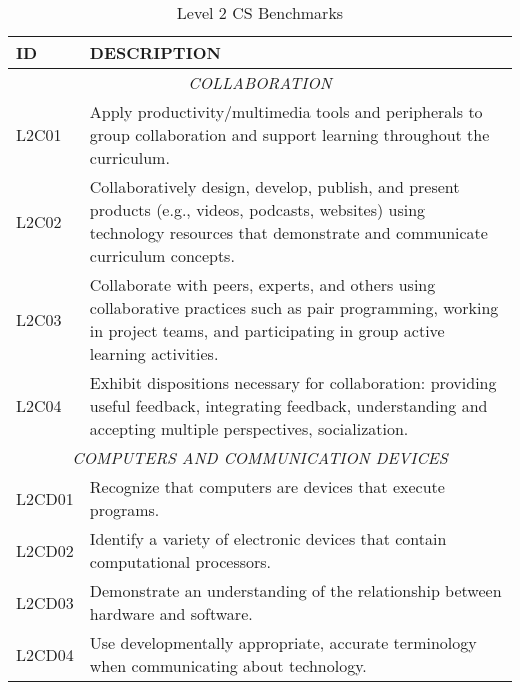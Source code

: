 \begin{longtable}{p{1.8cm}p{11cm}}
\caption{Level 2 CS Benchmarks} \\
\textbf{ID} & \textbf{DESCRIPTION} \\ \hline
\multicolumn{2}{c}{\textit{COLLABORATION}} \\
 L2C01   & Apply productivity/multimedia tools and peripherals to group collaboration and support learning throughout the curriculum.                                                                                                 \\
 L2C02   & Collaboratively design, develop, publish, and present products (e.g., videos, podcasts, websites) using technology resources that demonstrate and communicate curriculum concepts.                                         \\
 L2C03   & Collaborate with peers, experts, and others using collaborative practices such as pair programming, working in project teams, and participating in group active learning activities.                                       \\
 L2C04   & Exhibit dispositions necessary for collaboration: providing useful feedback, integrating feedback, understanding and accepting multiple perspectives, socialization.                                                       \\
 \multicolumn{2}{c}{\textit{COMPUTERS AND COMMUNICATION DEVICES}}                                                                                                                                                                                   \\
 L2CD01  & Recognize that computers are devices that execute programs.                                                                                                                                                                \\
 L2CD02  & Identify a variety of electronic devices that contain computational processors.                                                                                                                                            \\
 L2CD03  & Demonstrate an understanding of the relationship between hardware and software.                                                                                                                                            \\
 L2CD04  & Use developmentally appropriate, accurate terminology when communicating about technology.                                                                                                                                 \\

\end{longtable}
